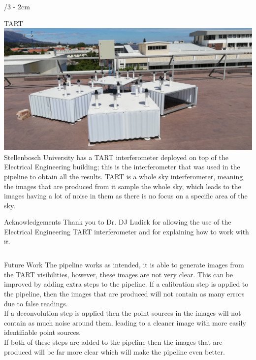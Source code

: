 \documentclass[landscape]{uioposter}
\begin{document}
\begin{frame}
\begin{columns}[onlytextwidth]
\begin{column}{\textwidth/3 - 2cm}
    \begin{block}{TART}
        \vspace{-1cm}
        \includegraphics[scale=0.2]{Images/IMG_20190320_121412.jpg}
        Stellenbosch University has a TART interferometer deployed on top of the Electrical Engineering building; this is the interferometer that was used in the pipeline to obtain all the results. TART is a whole sky interferometer, meaning the images that are produced from it sample the whole sky, which leads to the images having a lot of noise in them as there is no focus on a specific area of the sky.
    \end{block}
    \vspace{-0.8cm}
    \begin{block}{Acknowledgements}
        Thank you to Dr. DJ Ludick for allowing the use of the Electrical Engineering TART interferometer and for explaining how to work with it.
    \end{block}


\end{column}

\vspace{2cm}

\end{columns}
\begin{columns}
    \begin{column}{\textwidth}
        \begin{block}{Future Work}
            The pipeline works as intended, it is able to generate images from the TART visibilities, however, these images are not very clear. This can be improved by adding extra steps to the pipeline. If a calibration step is applied to the pipeline, then the images that are produced will not contain as many errors due to false readings. \\
            If a deconvolution step is applied then the point sources in the images will not contain as much noise around them, leading to a cleaner image with more easily identifiable point sources.\\
            If both of these steps are added to the pipeline then the images that are produced will be far more clear which will make the pipeline even better.
        \end{block}
    \end{column}
\end{columns}


\end{frame}
\end{document}
